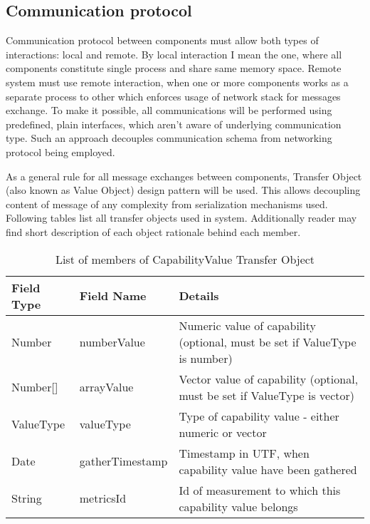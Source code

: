 \subsection{Communication protocol}
\label{subsec:arch_comm_protocol}

Communication protocol between components must allow both types of interactions: local and remote. By local interaction I mean the one, where all components constitute single process and share same memory space. Remote system must use remote interaction, when one or more components works as a separate process to other which enforces usage of network stack for messages exchange. To make it possible, all communications will be performed using predefined, plain interfaces, which aren't aware of underlying communication type. Such an approach decouples communication schema from networking protocol being employed.

As a general rule for all message exchanges between components, Transfer Object (also known as Value Object) design pattern will be used\cite{0131422464}. This allows decoupling content of message of any complexity from serialization mechanisms used. Following tables list all transfer objects used in system. Additionally reader may find short description of each object rationale behind each member. 

\renewcommand*\arraystretch{1.2}

\begin{table}[ht] %
\begin{tabular}{| m{} | m{} | m{} |}
\hline 
\cellcolor[gray]{0.9} Field Type & \cellcolor[gray]{0.9} Field Name & \cellcolor[gray]{0.9} Details \\
\hline 
Number & numberValue & Numeric value of capability (optional, must be set if ValueType is number) \\
Number[] & arrayValue & Vector value of capability (optional, must be set if ValueType is vector) \\
ValueType & valueType & Type of capability value - either numeric or vector\\
Date & gatherTimestamp & Timestamp in UTF, when capability value have been gathered \\
String & metricsId & Id of measurement to which this capability value belongs \\
\hline 
\end{tabular}
\caption{List of members of CapabilityValue Transfer Object}
\label{tab:TO_CapValue}
\end{table} %

